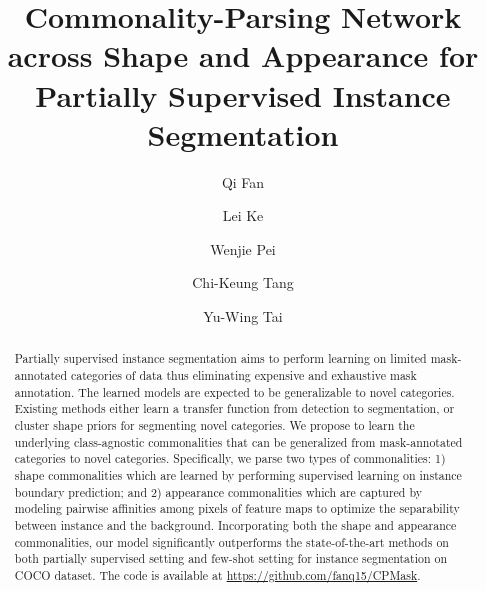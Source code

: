 \documentclass[runningheads]{llncs}
\newcommand{\mymodel}{Commonality-Parsing Network\xspace}
\begin{document}
\pagestyle{headings}
\mainmatter
\def\ECCVSubNumber{596}  

\title{\mymodel across Shape and Appearance for Partially Supervised  Instance Segmentation} 



\begin{comment}
\titlerunning{ECCV-20 submission ID \ECCVSubNumber} 
\authorrunning{ECCV-20 submission ID \ECCVSubNumber} 
\author{Anonymous ECCV submission}
\institute{Paper ID \ECCVSubNumber}
\end{comment}


\titlerunning{\mymodel}


\def\thefootnote{}
\def\thefootnote{}

\author{Qi Fan \and
Lei Ke \and
Wenjie Pei \and
Chi-Keung Tang \and
Yu-Wing Tai}
\maketitle

\begin{abstract}

Partially supervised instance segmentation aims to perform learning on limited mask-annotated categories of data thus eliminating expensive and exhaustive mask annotation. The learned models are expected to be generalizable to novel categories. Existing methods either learn a transfer function from detection to segmentation, or cluster shape priors for segmenting novel categories. We propose to learn the underlying class-agnostic commonalities that can be generalized from mask-annotated categories to novel categories. Specifically, we parse two types of commonalities: 1) shape commonalities which are learned by performing supervised learning on instance boundary prediction; and 2) appearance commonalities which are captured by modeling pairwise affinities among pixels of feature maps to optimize the separability between instance and the background. Incorporating both the shape and appearance commonalities, our model significantly outperforms the state-of-the-art methods on both partially supervised setting and few-shot setting for instance segmentation on COCO dataset. The code is available at {\color{magenta}\url{https://github.com/fanq15/CPMask}}.


\vspace{-3mm}
\end{abstract}
\end{document}
